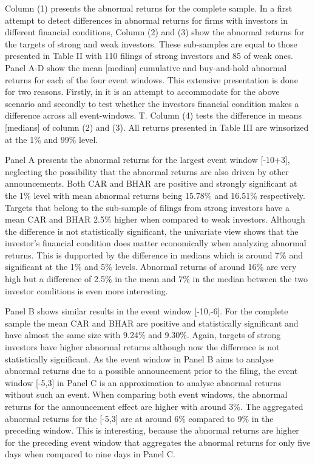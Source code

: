 \documentclass[12pt]{article}
\begin{document}
Column (1) presents the abnormal returns for the complete sample. In a first attempt to detect differences in abnormal returns for firms with investors in different financial conditions, Column (2) and (3) show the abnormal returns for the targets of strong and weak investors. These sub-samples are equal to those presented in Table II with 110 filings of strong investors and 85 of weak ones.
Panel A-D show the mean [median] cumulative and buy-and-hold abnormal returns for each of the four event windows. This extensive presentation is done for two reasons. Firstly, in it is an attempt to accommodate for the above scenario and secondly to test whether the investors financial condition makes a difference across all event-windows.   T. Column (4) tests the difference in means [medians] of column (2) and (3). All returns presented in Table III are winsorized at the 1\% and 99\% level.

Panel A presents the abnormal returns for the largest event window [-10+3], neglecting the possibility that the abnormal returns are also driven by other announcements. Both CAR and BHAR are positive and strongly significant at the 1\% level with mean abnormal returns being 15.78\% and 16.51\% respectively. Targets that belong to the sub-sample of filings from strong investors have a mean CAR and BHAR 2.5\% higher when compared to weak investors. Although the difference is not statistically significant, the univariate view shows that the investor's financial condition does matter economically when analyzing abnormal returns. This is dupported by the difference in medians which is around 7\% and significant at the 1\% and 5\% levels. Abnormal returns of around 16\% are very high but a difference of 2.5\% in the mean and 7\% in the median between the two investor conditions is even more interesting.  

Panel B shows similar results in the event window [-10,-6]. For the complete sample the mean CAR and BHAR are positive and statistically significant and have almost the same size with 9.24\% and 9.30\%. Again, targets of strong investors have higher abnormal returns although now the difference is not statistically significant.
As the event window in Panel B aims to analyse abnormal returns due to a possible announcement prior to the filing, the event window [-5,3] in Panel C is an approximation to analyse abnormal returns without such an event.
When comparing both event windows, the abnormal returns for the announcement effect are higher with around 3\%. The aggregated abnormal returns for the [-5,3] are at around 6\% compared to 9\% in the preceding window. This is interesting, because the abnormal returns are higher for the preceding event window that aggregates the abnormal returns for only five days when compared to nine days in Panel C.
\end{document}
